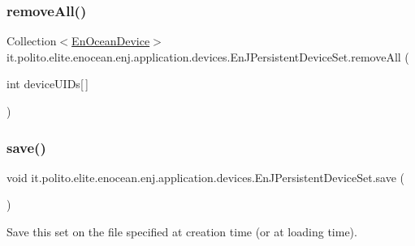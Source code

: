 \subsubsection{\texorpdfstring{remove\+All()}{removeAll()}\hspace{0.1cm}{\footnotesize\ttfamily [2/2]}}
{\footnotesize\ttfamily Collection$<$\hyperlink{classit_1_1polito_1_1elite_1_1enocean_1_1enj_1_1model_1_1_en_ocean_device}{En\+Ocean\+Device}$>$ it.\+polito.\+elite.\+enocean.\+enj.\+application.\+devices.\+En\+J\+Persistent\+Device\+Set.\+remove\+All (\begin{DoxyParamCaption}\item[{int}]{device\+U\+I\+Ds\mbox{[}$\,$\mbox{]} }\end{DoxyParamCaption})}

\hypertarget{classit_1_1polito_1_1elite_1_1enocean_1_1enj_1_1application_1_1devices_1_1_en_j_persistent_device_set_a7fcef06b5c7c011279764d7ee7c9f197}{}\label{classit_1_1polito_1_1elite_1_1enocean_1_1enj_1_1application_1_1devices_1_1_en_j_persistent_device_set_a7fcef06b5c7c011279764d7ee7c9f197} 
\subsubsection{\texorpdfstring{save()}{save()}\hspace{0.1cm}{\footnotesize\ttfamily [1/2]}}
{\footnotesize\ttfamily void it.\+polito.\+elite.\+enocean.\+enj.\+application.\+devices.\+En\+J\+Persistent\+Device\+Set.\+save (\begin{DoxyParamCaption}{ }\end{DoxyParamCaption})}

Save this set on the file specified at creation time (or at loading time). \hypertarget{classit_1_1polito_1_1elite_1_1enocean_1_1enj_1_1application_1_1devices_1_1_en_j_persistent_device_set_ad1001d18cfbe70797cb694246c490b00}{}\label{classit_1_1polito_1_1elite_1_1enocean_1_1enj_1_1application_1_1devices_1_1_en_j_persistent_device_set_ad1001d18cfbe70797cb694246c490b00} 
